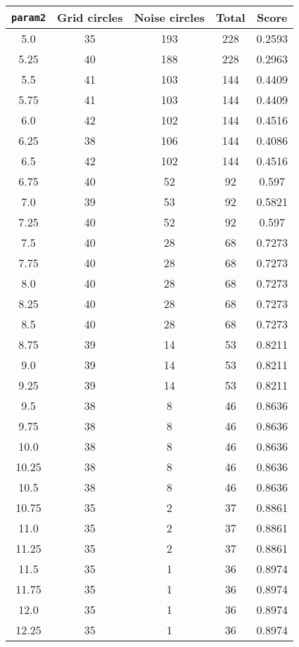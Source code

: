 \documentclass[letterpaper, 12pt]{article}
\begin{document}
\begin{longtable}{|c|c|c|c|c|}
\hline
\textbf{\texttt{param2}} & \textbf{Grid circles} & \textbf{Noise circles} & \textbf{Total} & \textbf{Score} \\
\hline
5.0 & 35 & 193 & 228 & 0.2593 \\
\hline
5.25 & 40 & 188 & 228 & 0.2963 \\
\hline
5.5 & 41 & 103 & 144 & 0.4409 \\
\hline
5.75 & 41 & 103 & 144 & 0.4409 \\
\hline
6.0 & 42 & 102 & 144 & 0.4516 \\
\hline
6.25 & 38 & 106 & 144 & 0.4086 \\
\hline
6.5 & 42 & 102 & 144 & 0.4516 \\
\hline
6.75 & 40 & 52 & 92 & 0.597 \\
\hline
7.0 & 39 & 53 & 92 & 0.5821 \\
\hline
7.25 & 40 & 52 & 92 & 0.597 \\
\hline
7.5 & 40 & 28 & 68 & 0.7273 \\
\hline
7.75 & 40 & 28 & 68 & 0.7273 \\
\hline
8.0 & 40 & 28 & 68 & 0.7273 \\
\hline
8.25 & 40 & 28 & 68 & 0.7273 \\
\hline
8.5 & 40 & 28 & 68 & 0.7273 \\
\hline
8.75 & 39 & 14 & 53 & 0.8211 \\
\hline
9.0 & 39 & 14 & 53 & 0.8211 \\
\hline
9.25 & 39 & 14 & 53 & 0.8211 \\
\hline
9.5 & 38 & 8 & 46 & 0.8636 \\
\hline
9.75 & 38 & 8 & 46 & 0.8636 \\
\hline
10.0 & 38 & 8 & 46 & 0.8636 \\
\hline
10.25 & 38 & 8 & 46 & 0.8636 \\
\hline
10.5 & 38 & 8 & 46 & 0.8636 \\
\hline
10.75 & 35 & 2 & 37 & 0.8861 \\
\hline
11.0 & 35 & 2 & 37 & 0.8861 \\
\hline
11.25 & 35 & 2 & 37 & 0.8861 \\
\hline
11.5 & 35 & 1 & 36 & 0.8974 \\
\hline
11.75 & 35 & 1 & 36 & 0.8974 \\
\hline
12.0 & 35 & 1 & 36 & 0.8974 \\
\hline
12.25 & 35 & 1 & 36 & 0.8974 \\
\hline

\end{longtable}
\end{document}
